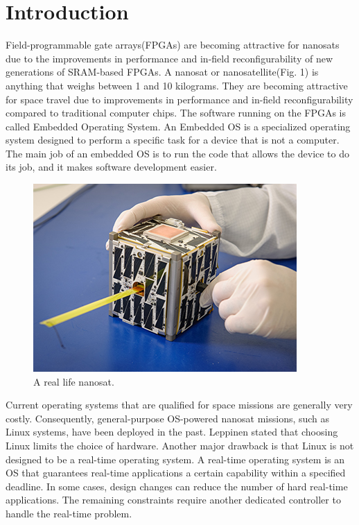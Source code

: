 \documentclass[conference]{IEEEtran}
\begin{document}
\section{Introduction}
Field-programmable gate arrays(FPGAs) are becoming attractive for nanosats due to the improvements in 
performance and in-field reconfigurability of new generations of SRAM-based FPGAs. A nanosat or nanosatellite(Fig. 1)
is anything that weighs between 1 and 10 kilograms. They are becoming attractive for space travel due to improvements 
in performance and in-field reconfigurability compared to traditional computer chips.
The software running on the FPGAs is called Embedded Operating System. An Embedded OS is a specialized operating system
designed to perform a specific task for a device that is not a computer. The main job of an embedded OS is to run the 
code that allows the device to do its job, and it makes software development easier. 
\begin{figure}[h]
    \centering
    \includegraphics[scale = 2.5]{nanosat.jpg}
    \caption{A real life nanosat.}
\end{figure}
Current operating systems that are qualified for space missions are generally very costly. Consequently, general-purpose
OS-powered nanosat missions, such as Linux systems, have been deployed in the past. Leppinen \cite{b1} stated that choosing 
Linux limits the choice of hardware. Another major drawback is that Linux is not designed to be a real-time operating 
system. A real-time operating system is an OS that guarantees real-time applications a certain capability within a specified 
deadline. In some cases, design changes can reduce the number of hard real-time applications. The remaining constraints 
require another dedicated controller to handle the real-time problem. 

\end{document}
